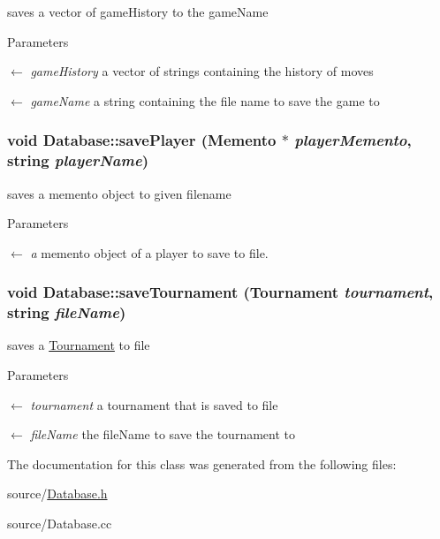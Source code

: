 saves a vector of gameHistory to the gameName 
\begin{DoxyParams}{Parameters}
\item[\mbox{$\leftarrow$} {\em gameHistory}]a vector of strings containing the history of moves \item[\mbox{$\leftarrow$} {\em gameName}]a string containing the file name to save the game to \end{DoxyParams}
\hypertarget{classDatabase_a656673898e8f702a1b009c9c74d13b3e}{
\subsubsection[{savePlayer}]{\setlength{\rightskip}{0pt plus 5cm}void Database::savePlayer ({\bf Memento} $\ast$ {\em playerMemento}, \/  string {\em playerName})}}
\label{classDatabase_a656673898e8f702a1b009c9c74d13b3e}


saves a memento object to given filename 
\begin{DoxyParams}{Parameters}
\item[\mbox{$\leftarrow$} {\em a}]memento object of a player to save to file. \end{DoxyParams}
\hypertarget{classDatabase_aba5f0b5de3883729e5b0be7cf5b17b8c}{
\subsubsection[{saveTournament}]{\setlength{\rightskip}{0pt plus 5cm}void Database::saveTournament ({\bf Tournament} {\em tournament}, \/  string {\em fileName})}}
\label{classDatabase_aba5f0b5de3883729e5b0be7cf5b17b8c}


saves a \hyperlink{classTournament}{Tournament} to file 
\begin{DoxyParams}{Parameters}
\item[\mbox{$\leftarrow$} {\em tournament}]a tournament that is saved to file \item[\mbox{$\leftarrow$} {\em fileName}]the fileName to save the tournament to \end{DoxyParams}


The documentation for this class was generated from the following files:\begin{DoxyCompactItemize}
\item 
source/\hyperlink{Database_8h}{Database.h}\item 
source/Database.cc\end{DoxyCompactItemize}
